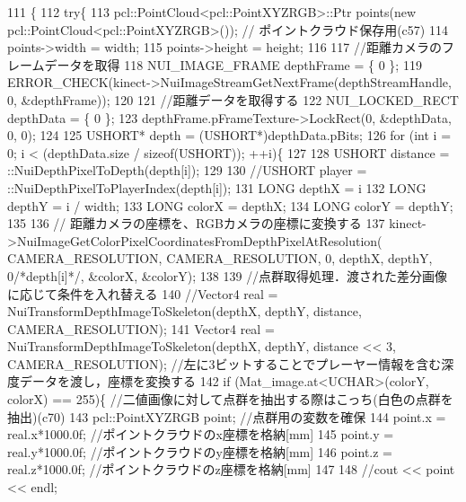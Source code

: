 \begin{DoxyCode}
111 \{
112     \textcolor{keywordflow}{try}\{
113         pcl::PointCloud<pcl::PointXYZRGB>::Ptr points(\textcolor{keyword}{new} pcl::PointCloud<pcl::PointXYZRGB>()); \textcolor{comment}{//
      ポイントクラウド保存用(c57)}
114         points->width = width;
115         points->height = height;
116 
117         \textcolor{comment}{//距離カメラのフレームデータを取得}
118         NUI\_IMAGE\_FRAME depthFrame = \{ 0 \};
119         ERROR_CHECK(kinect->NuiImageStreamGetNextFrame(depthStreamHandle, 0, &depthFrame));
120 
121         \textcolor{comment}{//距離データを取得する}
122         NUI\_LOCKED\_RECT depthData = \{ 0 \};
123         depthFrame.pFrameTexture->LockRect(0, &depthData, 0, 0);
124 
125         USHORT* depth = (USHORT*)depthData.pBits;
126         for (\textcolor{keywordtype}{int} i = 0; i < (depthData.size / \textcolor{keyword}{sizeof}(USHORT)); ++i)\{
127 
128             USHORT distance = ::NuiDepthPixelToDepth(depth[i]);
129 
130             \textcolor{comment}{//USHORT player = ::NuiDepthPixelToPlayerIndex(depth[i]);}
131             LONG depthX = i %
132             LONG depthY = i / width;
133             LONG colorX = depthX;
134             LONG colorY = depthY;
135 
136             \textcolor{comment}{// 距離カメラの座標を、RGBカメラの座標に変換する}
137             kinect->NuiImageGetColorPixelCoordinatesFromDepthPixelAtResolution(
      CAMERA_RESOLUTION, CAMERA_RESOLUTION, 0, depthX, depthY, 0\textcolor{comment}{/*depth[i]*/}, &colorX, &colorY);
138 
139             \textcolor{comment}{//点群取得処理．渡された差分画像に応じて条件を入れ替える}
140             \textcolor{comment}{//Vector4 real = NuiTransformDepthImageToSkeleton(depthX, depthY, distance, CAMERA\_RESOLUTION);}
141             Vector4 real = NuiTransformDepthImageToSkeleton(depthX, depthY, distance << 3, 
      CAMERA_RESOLUTION); \textcolor{comment}{//左に3ビットすることでプレーヤー情報を含む深度データを渡し，座標を変換する}
142             \textcolor{keywordflow}{if} (Mat\_image.at<UCHAR>(colorY, colorX) == 255)\{ \textcolor{comment}{//二値画像に対して点群を抽出する際はこっち(白色の点群を抽出)(c70)}
143                 pcl::PointXYZRGB point; \textcolor{comment}{//点群用の変数を確保}
144                 point.x = real.x*1000.0f; \textcolor{comment}{//ポイントクラウドのx座標を格納[mm]}
145                 point.y = real.y*1000.0f; \textcolor{comment}{//ポイントクラウドのy座標を格納[mm]}
146                 point.z = real.z*1000.0f; \textcolor{comment}{//ポイントクラウドのz座標を格納[mm]}
147 
148                 \textcolor{comment}{//cout << point << endl;}

\end{DoxyCode}
